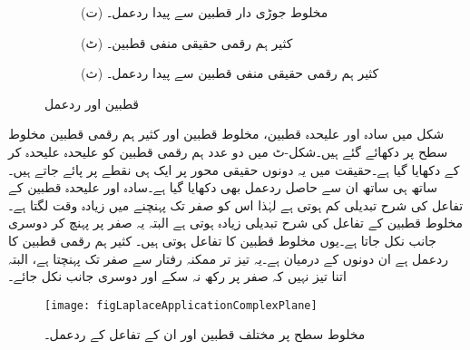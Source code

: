 \begin{figure}
\begin{subfigure}{0.5\textwidth}
\caption*{(ت) مخلوط جوڑی دار قطبین سے پیدا ردعمل۔}
\end{subfigure}
\begin{subfigure}{0.5\textwidth}
\centering
{}
\caption*{(ٹ) کثیر ہم رقمی حقیقی منفی قطبین۔}
\end{subfigure}%
\begin{subfigure}{0.5\textwidth}
\centering
{}
\caption*{(ث) کثیر ہم رقمی حقیقی منفی قطبین سے پیدا ردعمل۔}
\end{subfigure}
\caption{قطبین اور ردعمل}
\label{شکل_لاپلاس_استعمال_قطبین_اور_ردعمل}
\end{figure}

شکل  میں سادہ اور علیحدہ قطبین، مخلوط قطبین اور کثیر  ہم رقمی قطبین مخلوط سطح پر دکھائے گئے ہیں۔شکل-ٹ میں دو عدد ہم رقمی قطبین کو علیحدہ علیحدہ کر کے دکھایا گیا ہے۔حقیقت میں یہ دونوں حقیقی محور پر ایک ہی نقطے پر پائے جاتے ہیں۔ساتھ ہی ساتھ ان سے حاصل ردعمل بھی دکھایا گیا ہے۔سادہ اور علیحدہ قطبین کے تفاعل  کی شرح تبدیلی کم ہوتی ہے لہٰذا اس کو صفر تک پہنچنے میں زیادہ وقت لگتا ہے۔ مخلوط قطبین کے تفاعل کی شرح تبدیلی زیادہ ہوتی ہے البتہ یہ صفر پر پہنچ کر دوسری جانب نکل جاتا ہے۔یوں مخلوط قطبین کا تفاعل  ہوتی ہیں۔ کثیر ہم رقمی قطبین کا ردعمل ہے ان دونوں کے درمیان ہے۔یہ تیز تر ممکنہ رفتار سے صفر تک پہنچتا ہے، البتہ اتنا تیز نہیں کہ صفر پر رکھ نہ سکے اور دوسری جانب نکل جائے۔

\begin{figure}
\centering
\texttt{[image: figLaplaceApplicationComplexPlane]}
\caption{مخلوط سطح پر مختلف قطبین اور ان کے تفاعل کے ردعمل۔}
\label{شکل_لاپلاس_استعمال_مختلف_قطبین}
\end{figure}

